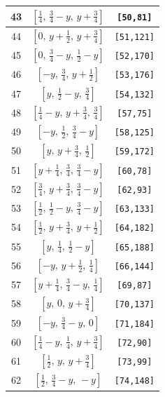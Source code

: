 \documentclass[fleqn,8pt]{jsarticle}
\begin{document}
\begin{longtable}{ccc}
43 & $\left[ \frac{1}{4},\, \frac{3}{4} - y,\, y + \frac{3}{4} \right]$ & {\tt [50,81]} \\ \hline
44 & $\left[ 0,\, y + \frac{1}{2},\, y + \frac{3}{4} \right]$ & {\tt [51,121]} \\ \hline
45 & $\left[ 0,\, \frac{3}{4} - y,\, \frac{1}{2} - y \right]$ & {\tt [52,170]} \\ \hline
46 & $\left[ - y,\, \frac{3}{4},\, y + \frac{1}{2} \right]$ & {\tt [53,176]} \\ \hline
47 & $\left[ y,\, \frac{1}{2} - y,\, \frac{3}{4} \right]$ & {\tt [54,132]} \\ \hline
48 & $\left[ \frac{1}{4} - y,\, y + \frac{3}{4},\, \frac{3}{4} \right]$ & {\tt [57,75]} \\ \hline
49 & $\left[ - y,\, \frac{1}{2},\, \frac{3}{4} - y \right]$ & {\tt [58,125]} \\ \hline
50 & $\left[ y,\, y + \frac{3}{4},\, \frac{1}{2} \right]$ & {\tt [59,172]} \\ \hline
51 & $\left[ y + \frac{1}{4},\, \frac{3}{4},\, \frac{3}{4} - y \right]$ & {\tt [60,78]} \\ \hline
52 & $\left[ \frac{3}{4},\, y + \frac{3}{4},\, \frac{3}{4} - y \right]$ & {\tt [62,93]} \\ \hline
53 & $\left[ \frac{1}{2},\, \frac{1}{2} - y,\, \frac{3}{4} - y \right]$ & {\tt [63,133]} \\ \hline
54 & $\left[ \frac{1}{2},\, y + \frac{3}{4},\, y + \frac{1}{2} \right]$ & {\tt [64,182]} \\ \hline
55 & $\left[ y,\, \frac{1}{4},\, \frac{1}{2} - y \right]$ & {\tt [65,188]} \\ \hline
56 & $\left[ - y,\, y + \frac{1}{2},\, \frac{1}{4} \right]$ & {\tt [66,144]} \\ \hline
57 & $\left[ y + \frac{1}{4},\, \frac{3}{4} - y,\, \frac{1}{4} \right]$ & {\tt [69,87]} \\ \hline
58 & $\left[ y,\, 0,\, y + \frac{3}{4} \right]$ & {\tt [70,137]} \\ \hline
59 & $\left[ - y,\, \frac{3}{4} - y,\, 0 \right]$ & {\tt [71,184]} \\ \hline
60 & $\left[ \frac{1}{4} - y,\, \frac{1}{4},\, y + \frac{3}{4} \right]$ & {\tt [72,90]} \\ \hline
61 & $\left[ \frac{1}{2},\, y,\, y + \frac{3}{4} \right]$ & {\tt [73,99]} \\ \hline
62 & $\left[ \frac{1}{2},\, \frac{3}{4} - y,\, - y \right]$ & {\tt [74,148]} \\ \hline

\end{longtable}
\end{document}
